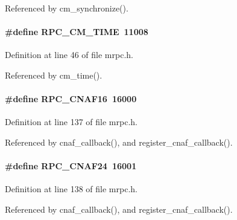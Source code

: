 Referenced by cm\_\-synchronize().
\paragraph[{RPC\_\-CM\_\-TIME}]{\setlength{\rightskip}{0pt plus 5cm}\#define RPC\_\-CM\_\-TIME~11008}\hfill\label{group__mrpcdefineh_ga087c4a9e16ed585101f90c1417ce3e8e}

\begin{DoxyItemize}
\item 
\end{DoxyItemize}

Definition at line 46 of file mrpc.h.

Referenced by cm\_\-time().
\paragraph[{RPC\_\-CNAF16}]{\setlength{\rightskip}{0pt plus 5cm}\#define RPC\_\-CNAF16~16000}\hfill\label{group__mrpcdefineh_ga04139d1c129e9a87093587d16d8ac5a4}

\begin{DoxyItemize}
\item 
\end{DoxyItemize}

Definition at line 137 of file mrpc.h.

Referenced by cnaf\_\-callback(), and register\_\-cnaf\_\-callback().
\paragraph[{RPC\_\-CNAF24}]{\setlength{\rightskip}{0pt plus 5cm}\#define RPC\_\-CNAF24~16001}\hfill\label{group__mrpcdefineh_gaf48c6e230ebd543627002769684a3240}

\begin{DoxyItemize}
\item 
\end{DoxyItemize}

Definition at line 138 of file mrpc.h.

Referenced by cnaf\_\-callback(), and register\_\-cnaf\_\-callback().

